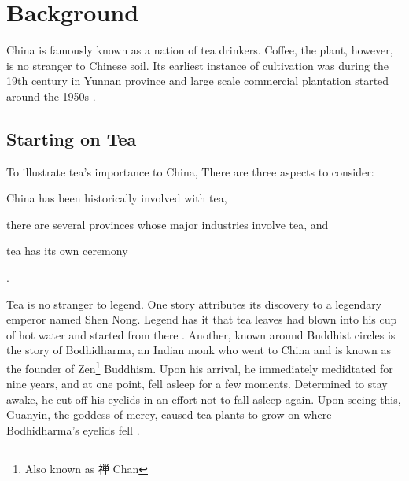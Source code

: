 \chapter{Background}\label{chap:background}

China is famously known as a nation of tea drinkers. Coffee, the plant, however,
is no stranger to Chinese soil. Its earliest instance of cultivation was during
the 19th century in Yunnan province and large scale commercial plantation started
around the 1950s \autocite{zhang_coffee_2014}.

\section{Starting on Tea}


To illustrate tea's importance to China, There are three aspects to consider:
\begin{enumerate*}
	\item China has been historically involved with tea,
	\item there are several provinces whose major industries involve tea, and
	\item tea has its own ceremony
\end{enumerate*}.

Tea is no stranger to legend. One story attributes its discovery to a legendary
emperor named Shen Nong. Legend has it that tea leaves had blown into his cup of
hot water and started from there \autocite[2]{fredholm_methylxanthines_2011}.
Another, known around Buddhist circles is the story of Bodhidharma, an
Indian monk who went to China and is known as the founder of Zen\footnote{Also
known as 禅 Chan} Buddhism. Upon his arrival, he immediately medidtated for nine
years, and at one point, fell asleep for a few moments. Determined to stay
awake, he cut off his eyelids in an effort not to fall asleep again. Upon seeing
this, Guanyin, the goddess of mercy, caused tea plants to grow on where
Bodhidharma's eyelids fell \autocite[2-3]{fredholm_methylxanthines_2011}.


